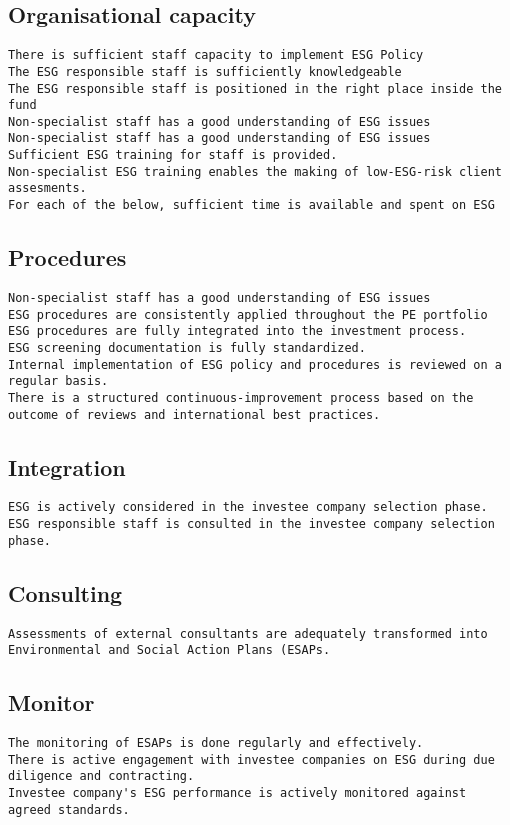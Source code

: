 \documentclass[twoside,12pt]{report}
\begin{document}
\subsection{Organisational capacity}
\begin{lstlisting}
There is sufficient staff capacity to implement ESG Policy
The ESG responsible staff is sufficiently knowledgeable
The ESG responsible staff is positioned in the right place inside the fund
Non-specialist staff has a good understanding of ESG issues
Non-specialist staff has a good understanding of ESG issues
Sufficient ESG training for staff is provided.
Non-specialist ESG training enables the making of low-ESG-risk client assesments.
For each of the below, sufficient time is available and spent on ESG
\end{lstlisting}

\subsection{Procedures}
\begin{lstlisting}
Non-specialist staff has a good understanding of ESG issues
ESG procedures are consistently applied throughout the PE portfolio
ESG procedures are fully integrated into the investment process.
ESG screening documentation is fully standardized.
Internal implementation of ESG policy and procedures is reviewed on a regular basis.
There is a structured continuous-improvement process based on the outcome of reviews and international best practices.
\end{lstlisting}

\subsection{Integration}
\begin{lstlisting}
ESG is actively considered in the investee company selection phase.
ESG responsible staff is consulted in the investee company selection phase.
\end{lstlisting}

\subsection{Consulting}
\begin{lstlisting}
Assessments of external consultants are adequately transformed into Environmental and Social Action Plans (ESAPs.
\end{lstlisting}

\subsection{Monitor}
\begin{lstlisting}
The monitoring of ESAPs is done regularly and effectively.
There is active engagement with investee companies on ESG during due diligence and contracting.
Investee company's ESG performance is actively monitored against agreed standards.
\end{lstlisting}
\end{document}
